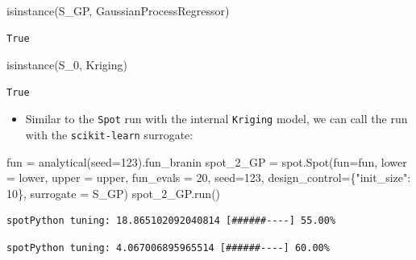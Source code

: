 \documentclass[
  letterpaper,
  DIV=11,
  numbers=noendperiod]{scrreprt}
\newenvironment{Shaded}{\begin{snugshade}}{\end{snugshade}}
\newcommand{\BuiltInTok}[1]{\textcolor[rgb]{0.00,0.23,0.31}{#1}}
\newcommand{\DecValTok}[1]{\textcolor[rgb]{0.68,0.00,0.00}{#1}}
\newcommand{\NormalTok}[1]{\textcolor[rgb]{0.00,0.23,0.31}{#1}}
\newcommand{\OperatorTok}[1]{\textcolor[rgb]{0.37,0.37,0.37}{#1}}
\newcommand{\StringTok}[1]{\textcolor[rgb]{0.13,0.47,0.30}{#1}}
\providecommand{\tightlist}{%
  \setlength{\itemsep}{0pt}\setlength{\parskip}{0pt}}\usepackage{longtable,booktabs,array}
\begin{document}
\begin{Shaded}
\begin{Highlighting}[]
\BuiltInTok{isinstance}\NormalTok{(S\_GP, GaussianProcessRegressor)}
\end{Highlighting}
\end{Shaded}

\begin{verbatim}
True
\end{verbatim}

\begin{Shaded}
\begin{Highlighting}[]
\BuiltInTok{isinstance}\NormalTok{(S\_0, Kriging)}
\end{Highlighting}
\end{Shaded}

\begin{verbatim}
True
\end{verbatim}

\begin{itemize}
\tightlist
\item
  Similar to the \texttt{Spot} run with the internal \texttt{Kriging}
  model, we can call the run with the \texttt{scikit-learn} surrogate:
\end{itemize}

\begin{Shaded}
\begin{Highlighting}[]
\NormalTok{fun }\OperatorTok{=}\NormalTok{ analytical(seed}\OperatorTok{=}\DecValTok{123}\NormalTok{).fun\_branin}
\NormalTok{spot\_2\_GP }\OperatorTok{=}\NormalTok{ spot.Spot(fun}\OperatorTok{=}\NormalTok{fun,}
\NormalTok{                   lower }\OperatorTok{=}\NormalTok{ lower,}
\NormalTok{                   upper }\OperatorTok{=}\NormalTok{ upper,}
\NormalTok{                   fun\_evals }\OperatorTok{=} \DecValTok{20}\NormalTok{,}
\NormalTok{                   seed}\OperatorTok{=}\DecValTok{123}\NormalTok{,}
\NormalTok{                   design\_control}\OperatorTok{=}\NormalTok{\{}\StringTok{"init\_size"}\NormalTok{: }\DecValTok{10}\NormalTok{\},}
\NormalTok{                   surrogate }\OperatorTok{=}\NormalTok{ S\_GP)}
\NormalTok{spot\_2\_GP.run()}
\end{Highlighting}
\end{Shaded}

\begin{verbatim}
spotPython tuning: 18.865102092040814 [######----] 55.00% 
\end{verbatim}

\begin{verbatim}
spotPython tuning: 4.067006895965514 [######----] 60.00% 
\end{verbatim}
\end{document}
